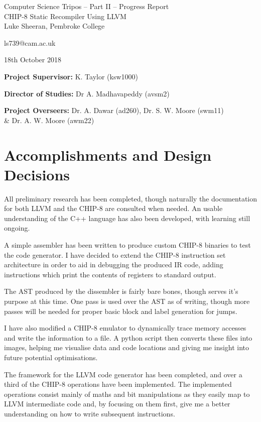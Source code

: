 \documentclass[12pt,a4paper,twoside]{article}
\begin{document}
\begin{center}
\Large
Computer Science Tripos -- Part II -- Progress Report\\[4mm]
\LARGE
CHIP-8 Static Recompiler Using LLVM\\[4mm]

\large
Luke Sheeran, Pembroke College

ls739@cam.ac.uk

18th October 2018
\end{center}

\vspace{5mm}

\textbf{Project Supervisor:} K. Taylor (ksw1000)

\textbf{Director of Studies:} Dr A. Madhavapeddy (avsm2)

\textbf{Project Overseers:} Dr. A. Dawar (ad260), Dr. S. W. Moore (swm11) \\\& Dr. A. W. Moore (awm22)



\section*{Accomplishments and Design Decisions}
All preliminary research has been completed, though naturally the documentation for both LLVM and the CHIP-8 are consulted when needed. An usable understanding of the C++ language has also been developed, with learning still ongoing.

A simple assembler has been written to produce custom CHIP-8 binaries to test the code generator. I have decided to extend the CHIP-8 instruction set architecture in order to aid in debugging the produced IR code, adding instructions which print the contents of registers to standard output.

The AST produced by the dissembler is fairly bare bones, though serves it's purpose at this time. One pass is used over the AST as of writing, though more passes will be needed for proper basic block and label generation for jumps.

I have also modified a CHIP-8 emulator to dynamically trace memory accesses and write the information to a file. A python script then converts these files into images, helping me visualise data and code locations and giving me insight into future potential optimisations.

The framework for the LLVM code generator has been completed, and over a third of the CHIP-8 operations have been implemented. The implemented operations consist mainly of maths and bit manipulations as they easily map to LLVM intermediate code and, by focusing on them first, give me a better understanding on how to write subsequent instructions.
\end{document}

